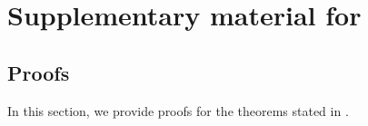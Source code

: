 \chapter[Supplementary material for Chapter 4]{\label{chap:price-appendix} Supplementary material for }

%

\section{\label{sec:proofs}Proofs}

In this section, we provide proofs for the theorems stated in .





